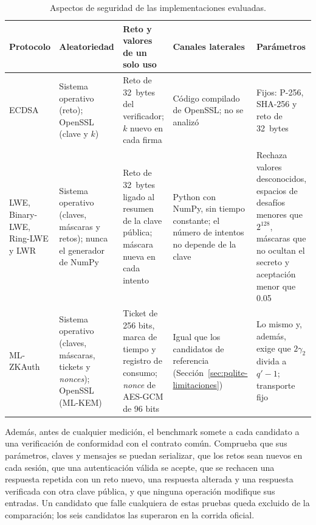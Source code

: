 \begin{table}[H]
\centering
\caption{Aspectos de seguridad de las implementaciones evaluadas.}
\label{tab:implementation-security}
\small
\setlength{\tabcolsep}{4pt}
\begin{tabularx}{\textwidth}{>{\raggedright\arraybackslash}p{2.4cm}YYYY}
\toprule
\textbf{Protocolo} &
\textbf{Aleatoriedad} &
\textbf{Reto y valores de un solo uso} &
\textbf{Canales laterales} &
\textbf{Parámetros} \\
\midrule

ECDSA &
Sistema operativo (reto); OpenSSL (clave y $k$) &
Reto de 32~bytes del verificador; $k$ nuevo en cada firma &
Código compilado de OpenSSL; no se analizó &
Fijos: P-256, SHA-256 y reto de 32~bytes \\

LWE, Binary-LWE, Ring-LWE y LWR &
Sistema operativo (claves, máscaras y retos); nunca el generador de NumPy &
Reto de 32~bytes ligado al resumen de la clave pública; máscara nueva en cada intento &
Python con NumPy, sin tiempo constante; el número de intentos no depende de la clave &
Rechaza valores desconocidos, espacios de desafíos menores que $2^{128}$, máscaras que no ocultan el secreto y aceptación menor que 0.05 \\

ML-ZKAuth &
Sistema operativo (claves, máscaras, tickets y \textit{nonces}); OpenSSL (ML-KEM) &
Ticket de 256 bits, marca de tiempo y registro de consumo; \textit{nonce} de AES-GCM de 96 bits &
Igual que los candidatos de referencia (Sección~\ref{sec:pqlite-limitaciones}) &
Lo mismo y, además, exige que $2\gamma_2$ divida a $q' - 1$; transporte fijo \\

\bottomrule
\end{tabularx}
\end{table}

Además, antes de cualquier medición, el benchmark somete a cada candidato a una verificación de conformidad con el contrato común. Comprueba que sus parámetros, claves y mensajes se puedan serializar, que los retos sean nuevos en cada sesión, que una autenticación válida se acepte, que se rechacen una respuesta repetida con un reto nuevo, una respuesta alterada y una respuesta verificada con otra clave pública, y que ninguna operación modifique sus entradas. Un candidato que falle cualquiera de estas pruebas queda excluido de la comparación; los seis candidatos las superaron en la corrida oficial.


